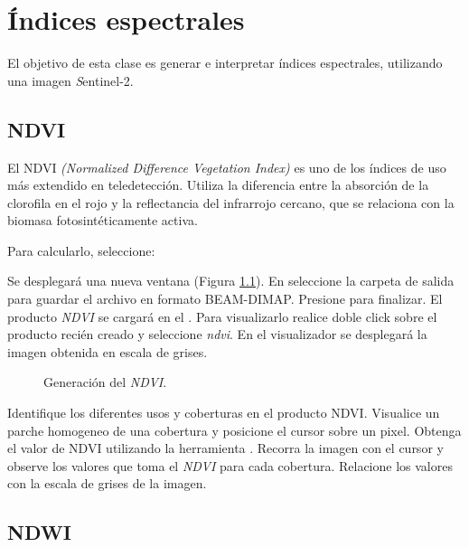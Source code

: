 \chapter{Índices espectrales}

El objetivo de esta clase es generar e interpretar índices espectrales, utilizando una imagen \emph Sentinel-2.


\section{NDVI}
El NDVI \emph{(Normalized Difference Vegetation Index)} es uno de los índices de uso más extendido en teledetección. Utiliza la diferencia entre la absorción de la clorofila en el rojo y la reflectancia del infrarrojo cercano, que se relaciona con la biomasa fotosintéticamente activa.

Para calcularlo, seleccione:

\begin{center}
\end{center}

Se desplegará una nueva ventana (Figura \ref{fig:NDVI}). En  seleccione la carpeta de salida para guardar el archivo en formato BEAM-DIMAP. Presione  para finalizar. El producto \emph{NDVI} se cargará en el . Para visualizarlo realice doble click sobre el producto recién creado y seleccione \emph{ndvi}. En el visualizador se desplegará la imagen obtenida en escala de grises.

\begin{figure}[h!]
    \centering
    \hspace{1cm}
    \caption{Generación del \emph{NDVI}.}
    \label{fig:NDVI}
\end{figure}

Identifique los diferentes usos y coberturas en el producto NDVI. Visualice un parche homogeneo de una cobertura y posicione el cursor sobre un pixel. Obtenga el valor de NDVI utilizando la herramienta  . Recorra la imagen con el cursor y observe los valores que toma el \emph{NDVI} para cada cobertura. Relacione los valores con la escala de grises de la imagen.


\section{NDWI}

